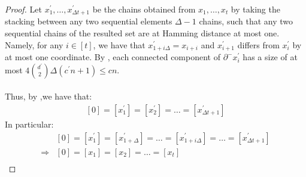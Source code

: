 \begin{proof}
  Let $x_{1}^{\prime}, \ldots, x^{\prime}_{\Delta t + 1}$ be the chains obtained from $x_{1}, \ldots, x_{t}$ by taking the stacking between any two sequential elements $\Delta-1$ chains, such that any two sequential chains of the resulted set are at Hamming distance at most one. Namely, for any $i \in [t]$, we have that $x_{1 + i\Delta}^{\prime} = x_{i + i}$ and $x^{\prime}_{i+1}$ differs from $x^{\prime}_{i}$ by at most one coordinate. By , each connected component of $\partial^{-}x^{\prime}_{i}$ has a size of at most $4{ d^{\prime} \choose 2 }\Delta (c^{\prime} n+1) \le c n$. 

  \paragraph{}
  Thus, by ,we have that:
  \begin{equation*}
    \begin{split}
      [0] = [x_{1}^{\prime}] =[x_{2}^{\prime}] = \ldots = [x_{\Delta t + 1}^{\prime}] 
    \end{split}
  \end{equation*}
  In particular: 
  \begin{equation*}
    \begin{split}
      & [0] = [x_{1}^{\prime}] =[x_{1 + \Delta}^{\prime}] = \ldots  =  [x_{1 + i \Delta}^{\prime} ]  =  \ldots = [x_{\Delta t + 1}^{\prime}] \\
      \Rightarrow  & [0] = [x_{1}] =[x_{2}] =   \ldots = [x_{t}] \\
    \end{split}
  \end{equation*}
\end{proof}




